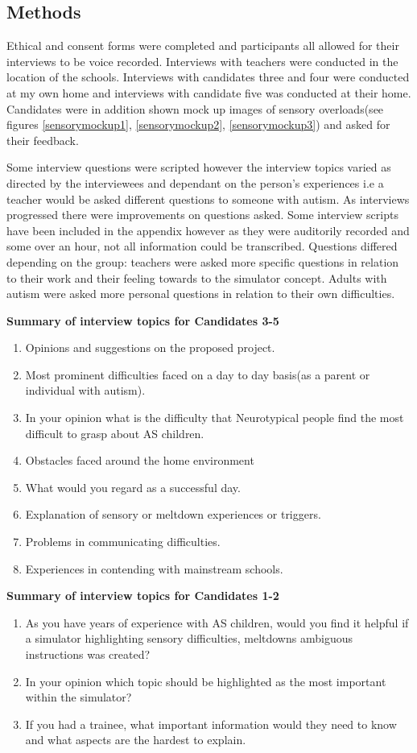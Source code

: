 \documentclass[11pt]{report}
\begin{document}
\subsection{Methods}
Ethical and consent forms were completed and participants all allowed for their interviews to be voice recorded. Interviews with teachers were conducted in the location of the schools. Interviews with candidates three and four were conducted at my own home and interviews with candidate five was conducted at their home. Candidates were in addition shown mock up images of sensory overloads(see figures \ref{sensorymockup1}, \ref{sensorymockup2}, \ref{sensorymockup3}) and asked for their feedback. 

Some interview questions were scripted however the interview topics varied as directed by the interviewees and dependant on the person's experiences i.e a teacher would be asked different questions to someone with autism. As interviews progressed there were improvements on questions asked. Some interview scripts have been included in the appendix however as they were auditorily recorded and some over an hour, not all information could be transcribed. Questions differed depending on the group: teachers were asked more specific questions in relation to their work and their feeling towards to the simulator concept. Adults with autism were asked more personal questions in relation to their own difficulties. 

\textbf{Summary of interview topics for Candidates 3-5}
\begin{enumerate}
\item Opinions and suggestions on the proposed project.
\item Most prominent difficulties faced on a day to day basis(as a parent or individual with autism).
\item In your opinion what is the difficulty that Neurotypical people find the most difficult to grasp about AS children.
\item Obstacles faced around the home environment
\item What would you regard as a successful day.
\item Explanation of sensory or meltdown experiences or triggers.
\item Problems in communicating difficulties.
\item Experiences in contending with mainstream schools.
\end{enumerate}

\textbf{Summary of interview topics for Candidates 1-2}
\begin{enumerate}
\item As you have years of experience with AS children, would you find it helpful if a simulator highlighting sensory difficulties, meltdowns ambiguous instructions was created?
\item In your opinion which topic should be highlighted as the most important within the simulator? 
\item If you had a trainee, what important information would they need to know and what aspects are the hardest to explain.
\end{enumerate}
\end{document}
